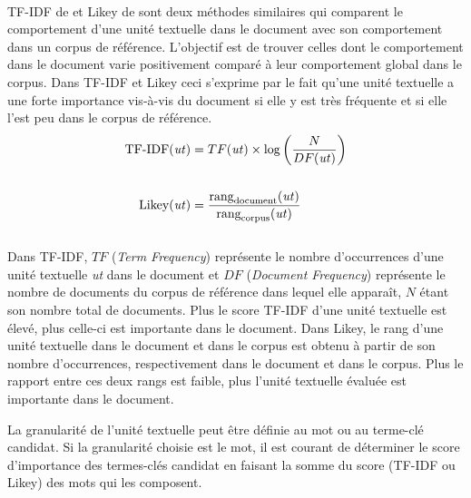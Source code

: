         ~\\TF-IDF de  et
        Likey de 
        sont deux méthodes similaires qui comparent le comportement d'une unité
        textuelle dans le document avec son comportement dans un corpus de
        référence. L'objectif est de trouver celles dont le
        comportement dans le document varie positivement comparé à leur
        comportement global dans le corpus. Dans TF-IDF et Likey ceci
        s'exprime par le fait qu'une unité textuelle a une forte importance
        vis-à-vis du document si elle y est très fréquente et si elle l'est
        peu dans le corpus de référence.
        \begin{align}
          \text{TF-IDF}(\text{\textit{ut}}) &= TF(\text{\textit{ut}}) \times \log\left(\frac{N}{DF(\text{\textit{ut}})}\right) \label{math:tfidf}\\
          \notag\\
          \text{Likey}(\text{\textit{ut}}) &= \frac{\text{rang}_{\text{document}}(\text{\textit{ut}})}{\text{rang}_{\text{corpus}}(\text{\textit{ut}})} \label{math:likey}
        \end{align}\\
        Dans TF-IDF, $TF$ (\textit{Term Frequency}) représente le nombre
        d'occurrences d'une unité textuelle \textit{ut} dans le document et $DF$
        (\textit{Document Frequency}) représente le nombre de documents du
        corpus de référence dans lequel elle apparaît, $N$ étant son nombre
        total de documents. Plus le score TF-IDF d'une unité textuelle est
        élevé, plus celle-ci est importante dans le document. Dans Likey, le
        rang d'une unité textuelle dans le document et dans le corpus est obtenu
        à partir de son nombre d'occurrences, respectivement dans le document et
        dans le corpus. Plus le rapport entre ces deux rangs est faible, plus
        l'unité textuelle évaluée est importante dans le document.

        La granularité de l'unité textuelle peut être définie au mot ou au
        terme-clé candidat. Si la granularité choisie est le mot, il est
        courant de déterminer le score d'importance des termes-clés candidat en
        faisant la somme du score (TF-IDF ou Likey) des mots qui les composent.


